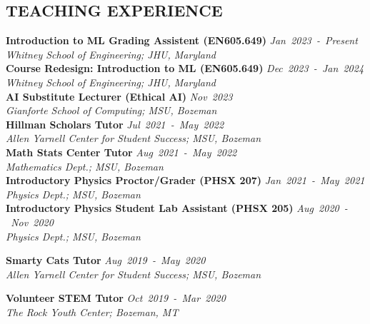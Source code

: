 \documentclass[margin]{res}
\begin{document}
\begin{resume}
\section{\uppercase{Teaching Experience}}
\textbf{Introduction to ML Grading Assistent (EN605.649)}\hfill
{\sl Jan~2023~-~Present}\\
{\sl Whitney School of Engineering; JHU, Maryland}\vspace*{1ex}\\
\textbf{Course Redesign: Introduction to ML (EN605.649)}\hfill
{\sl Dec~2023~-~Jan~2024}\\
{\sl Whitney School of Engineering; JHU, Maryland}\vspace*{1ex}\\
\textbf{AI Substitute Lecturer (Ethical AI)}\hfill
{\sl Nov~2023}\\
{\sl Gianforte School of Computing; MSU, Bozeman}\vspace*{1ex}\\
\textbf{Hillman Scholars Tutor}\hfill
{\sl Jul~2021~-~May~2022}\\
{\sl Allen Yarnell Center for Student Success; MSU, Bozeman}\vspace*{1ex}\\
\textbf{Math Stats Center Tutor}\hfill
{\sl Aug~2021~-~May~2022}\\
{\sl Mathematics Dept.; MSU, Bozeman}\vspace*{1ex}\\
\textbf{Introductory Physics Proctor/Grader (PHSX 207)} \hfill 
{\sl Jan~2021~-~May~2021}\\
{\sl Physics Dept.; MSU, Bozeman}\vspace*{1ex}\\
\textbf{Introductory Physics Student Lab Assistant (PHSX 205)}\hfill
{\sl Aug~2020~-~Nov~2020}\\
{\sl Physics Dept.; MSU, Bozeman}\vspace*{1ex}\\
\noindent
\raggedright
\textbf{Smarty Cats Tutor}\hfill
{\sl Aug~2019~-~May~2020}\\
{\sl Allen Yarnell Center for Student Success; MSU, Bozeman}\vspace*{1ex}\\
\noindent
\raggedright
\textbf{Volunteer STEM Tutor}\hfill
{\sl Oct~2019~-~Mar~2020}\\
{\sl The Rock Youth Center; Bozeman, MT}




\end{resume}
\end{document}
